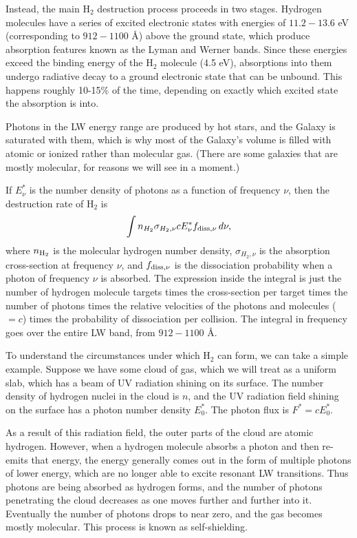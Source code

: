 Instead, the main H$_2$ destruction process proceeds in two stages. Hydrogen molecules have a series of excited electronic states with energies of $11.2-13.6$ eV (corresponding to $912-1100$ \AA) above the ground state, which produce absorption features known as the Lyman and Werner bands. Since these energies exceed the binding energy of the H$_2$ molecule (4.5 eV), absorptions into them undergo radiative decay to a ground electronic state that can be unbound. This happens roughly 10-15\% of the time, depending on exactly which excited state the absorption is into.

Photons in the LW energy range are produced by hot stars, and the Galaxy is saturated with them, which is why most of the Galaxy's volume is filled with atomic or ionized rather than molecular gas. (There are some galaxies that are mostly molecular, for reasons we will see in a moment.)

If $E^*_{\nu}$ is the number density of photons as a function of frequency $\nu$, then the destruction rate of H$_2$ is
\begin{equation}
\int n_{H_2} \sigma_{H_2,\nu} c E^*_{\nu} f_{\rm diss,\nu}\, d\nu,
\end{equation}
where $n_{\rm H_2}$ is the molecular hydrogen number density, $\sigma_{H_2,\nu}$ is the absorption cross-section at frequency $\nu$, and $f_{\rm diss,\nu}$ is the dissociation probability when a photon of frequency $\nu$ is absorbed. The expression inside the integral is just the number of hydrogen molecule targets times the cross-section per target times the number of photons times the relative velocities of the photons and molecules ($=c$) times the probability of dissociation per collision. The integral in frequency goes over the entire LW band, from $912-1100$ \AA.

To understand the circumstances under which H$_2$ can form, we can take a simple example. Suppose we have some cloud of gas, which we will treat as a uniform slab, which has a beam of UV radiation shining on its surface. The number density of hydrogen nuclei in the cloud is $n$, and the UV radiation field shining on the surface has a photon number density $E^*_0$. The photon flux is $F^* = c E^*_0$.

As a result of this radiation field, the outer parts of the cloud are atomic hydrogen. However, when a hydrogen molecule absorbs a photon and then re-emits that energy, the energy generally comes out in the form of multiple photons of lower energy, which are no longer able to excite resonant LW transitions. Thus photons are being absorbed as hydrogen forms, and the number of photons penetrating the cloud decreases as one moves further and further into it. Eventually the number of photons drops to near zero, and the gas becomes mostly molecular. This process is known as self-shielding.

